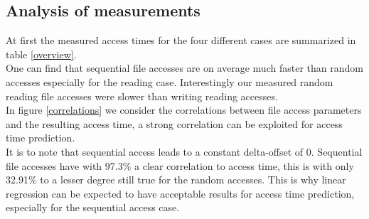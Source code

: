 \documentclass{superfri}
\begin{document}
\subsection{Analysis of measurements}
\label{sec:measurements}
At first the measured access times for the four different cases are summarized in table \ref{overview}.
\\
One can find that sequential file accesses are on average much faster than random accesses especially for the reading case.
Interestingly our measured random reading file accesses were slower than writing reading accesses.\\
In figure \ref{correlations} we consider the correlations between file access parameters and the resulting access time, a strong correlation can be exploited for access time prediction.
\\
It is to note that sequential access leads to a constant delta-offset of $0$.
Sequential file accesses have with 97.3\% a clear correlation to access time, this is with only 32.91\% to a lesser degree still true for the random accesses.
This is why linear regression can be expected to have acceptable results for access time prediction, especially for the sequential access case.\medskip
\end{document}
